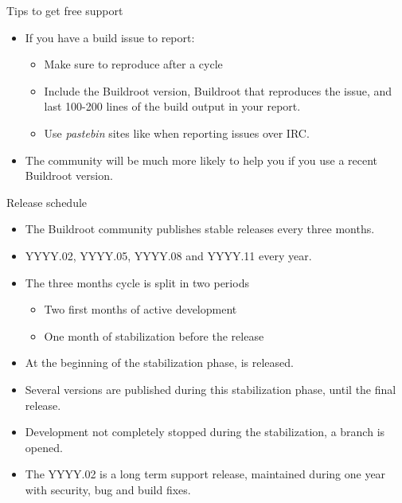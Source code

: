 \begin{frame}{Tips to get free support}
  \begin{itemize}
  \item If you have a build issue to report:
    \begin{itemize}
    \item Make sure to reproduce after a  cycle
    \item Include the Buildroot version, Buildroot  that
      reproduces the issue, and last 100-200 lines of the build
      output in your report.
    \item Use {\em pastebin} sites like 
      when reporting issues over IRC.
    \end{itemize}
  \item The community will be much more likely to help you if you use
    a recent Buildroot version.
  \end{itemize}
\end{frame}

\begin{frame}{Release schedule}
  \begin{itemize}
  \item The Buildroot community publishes stable releases every three
    months.
  \item YYYY.02, YYYY.05, YYYY.08 and YYYY.11 every year.
  \item The three months cycle is split in two periods
    \begin{itemize}
    \item Two first months of active development
    \item One month of stabilization before the release
    \end{itemize}
  \item At the beginning of the stabilization phase,  is
    released.
  \item Several  versions are published during this
    stabilization phase, until the final release.
  \item Development not completely stopped during the stabilization, a
     branch is opened.
  \item The YYYY.02 is a long term support release, maintained during
    one year with security, bug and build fixes.
  \end{itemize}
\end{frame}

